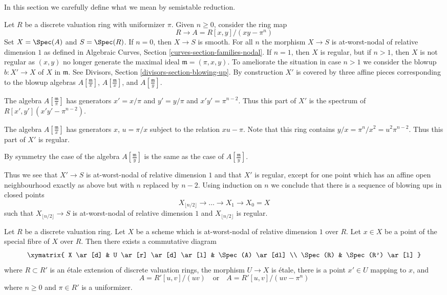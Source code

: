 \noindent
In this section we carefully define what we mean by semistable reduction.

\begin{example}
\label{example-blowup}
Let $R$ be a discrete valuation ring with uniformizer $\pi$.
Given $n \geq 0$, consider the ring map
$$
R \longrightarrow A = R[x, y]/(xy - \pi^n)
$$
Set $X = \Spec(A)$ and $S = \Spec(R)$.
If $n = 0$, then $X \to S$ is smooth.
For all $n$ the morphism $X \to S$ is at-worst-nodal
of relative dimension $1$ as defined in
Algebraic Curves, Section \ref{curves-section-families-nodal}.
If $n = 1$, then $X$ is regular, but if $n > 1$, then $X$ is not
regular as $(x, y)$ no longer generate the maximal ideal
$\mathfrak m = (\pi, x, y)$. To ameliorate the situation
in case $n > 1$ we
consider the blowup $b : X' \to X$ of $X$ in $\mathfrak m$.
See Divisors, Section \ref{divisors-section-blowing-up}.
By construction $X'$ is covered by three affine pieces
corresponding to the blowup algebras $A[\frac{\mathfrak m}{\pi}]$,
$A[\frac{\mathfrak m}{x}]$, and $A[\frac{\mathfrak m}{y}]$.

\medskip\noindent
The algebra $A[\frac{\mathfrak m}{\pi}]$ has generators
$x' = x/\pi$ and $y' = y/\pi$ and $x'y' = \pi^{n - 2}$.
Thus this part of $X'$ is the spectrum of $R[x', y'](x'y' - \pi^{n - 2})$.

\medskip\noindent
The algebra $A[\frac{\mathfrak m}{x}]$ has generators $x$,
$u = \pi/x$ subject to the relation $xu - \pi$. Note that this ring
contains $y/x = \pi^n/x^2 = u^2\pi^{n - 2}$. Thus this part of
$X'$ is regular.

\medskip\noindent
By symmetry the case of the algebra $A[\frac{\mathfrak m}{y}]$ is
the same as the case of $A[\frac{\mathfrak m}{y}]$.

\medskip\noindent
Thus we see that $X' \to S$ is at-worst-nodal of relative dimension $1$
and that $X'$ is regular, except for one point which has an
affine open neighbourhood exactly as above but with $n$ replaced by $n - 2$.
Using induction on $n$ we conclude that there is a sequence of
blowing ups in closed points
$$
X_{\lfloor n/2 \rfloor} \to \ldots \to X_1 \to X_0 = X
$$
such that $X_{\lfloor n/2 \rfloor} \to S$ is
at-worst-nodal of relative dimension $1$ and
$X_{\lfloor n/2 \rfloor}$ is regular.
\end{example}

\begin{lemma}
\label{lemma-etale-local-at-worst-nodal}
Let $R$ be a discrete valuation ring. Let $X$ be a scheme which is
at-worst-nodal of relative dimension $1$ over $R$.
Let $x \in X$ be a point of the special fibre
of $X$ over $R$. Then there exists a commutative diagram
$$
\xymatrix{
X \ar[d] &
U \ar[r] \ar[d] \ar[l] &
\Spec(A) \ar[dl] \\
\Spec(R) &
\Spec(R') \ar[l]
}
$$
where $R \subset R'$ is an \'etale extension of discrete valuation rings,
the morphism $U \to X$ is \'etale, there is a
point $x' \in U$ mapping to $x$, and
$$
A = R'[u, v]/(uv)
\quad\text{or}\quad
A = R'[u, v]/(uv - \pi^n)
$$
where $n \geq 0$ and $\pi \in R'$ is a uniformizer.
\end{lemma}

